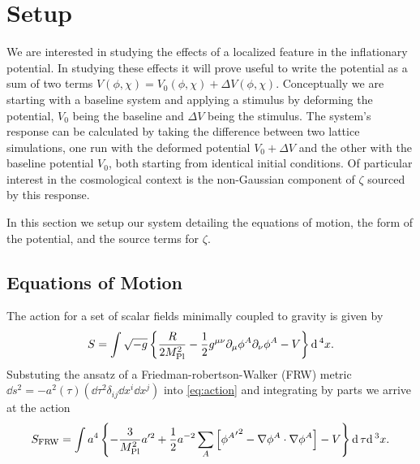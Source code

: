 
\section{Setup} \label{sec:setup}
We are interested in studying the effects of a localized feature in the inflationary potential.
In studying these effects it will prove useful to write the potential as a sum of two terms $V(\phi,\chi) = V_0(\phi,\chi) + \Delta V(\phi,\chi)$.
Conceptually we are starting with a baseline system and applying a stimulus by deforming the potential, $V_0$ being the baseline and $\Delta V$ being the stimulus.
The system's response can be calculated by taking the difference between two lattice simulations, one run with the deformed potential $V_0+\Delta V$ and the other with the baseline potential $V_0$, both starting from identical initial conditions.
Of particular interest in the cosmological context is the non-Gaussian component of $\zeta$ sourced by this response.

In this section we setup our system detailing the equations of motion, the form of the potential, and the source terms for $\zeta$.

\subsection{Equations of Motion}

The action for a set of scalar fields minimally coupled to gravity is given by
\begin{equation} \label{eq:action}
  S = \int \sqrt{-g}\left\{\frac{R}{2M_{\mathrm{Pl}}^2} - \frac{1}{2}g^{\mu\nu}\partial_\mu\phi^A\partial_\nu\phi^A - V \right\}\mathrm{d}\,^4x.
\end{equation} 
Substuting the ansatz of a Friedman-robertson-Walker (FRW) metric $\dd s^2 = -a^2(\tau)\left( \dd\tau^2 \delta_{ij}\dd x^i\dd x^j \right)$ into \eqref{eq:action} and integrating by parts we arrive at the action
\begin{equation} \label{eq:actionFRW}
  S_{\mathrm{FRW}} = \int a^4\left\{
  - \frac{3}{M_{\mathrm{Pl}}^2}a'^2
  + \frac{1}{2}a^{-2}\sum_A\left[{{\phi^A}'}^2
  - \nabla\phi^A\cdot\nabla\phi^A\right]
  - V
  \right\}\mathrm{d}\,\tau\mathrm{d}\,^3x.
\end{equation}
  

